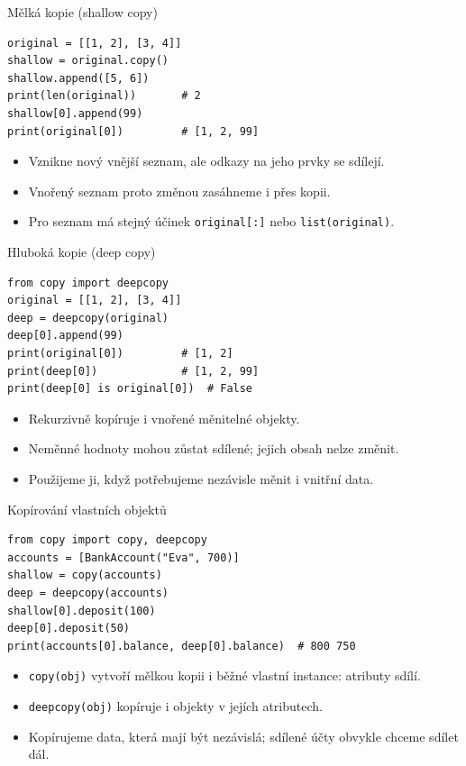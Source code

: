\documentclass[aspectratio=169]{beamer}
\begin{document}
\begin{frame}[fragile]{Mělká kopie (shallow copy)}
\begin{lstlisting}[style=python,basicstyle=\ttfamily\normalsize]
original = [[1, 2], [3, 4]]
shallow = original.copy()
shallow.append([5, 6])
print(len(original))       # 2
shallow[0].append(99)
print(original[0])         # [1, 2, 99]
\end{lstlisting}
  \begin{itemize}
    \item Vznikne nový vnější seznam, ale odkazy na jeho prvky se sdílejí.
    \item Vnořený seznam proto změnou zasáhneme i přes kopii.
    \item Pro seznam má stejný účinek \texttt{original[:]} nebo \texttt{list(original)}.
  \end{itemize}
\end{frame}

\begin{frame}[fragile]{Hluboká kopie (deep copy)}
\begin{lstlisting}[style=python,basicstyle=\ttfamily\normalsize]
from copy import deepcopy
original = [[1, 2], [3, 4]]
deep = deepcopy(original)
deep[0].append(99)
print(original[0])         # [1, 2]
print(deep[0])             # [1, 2, 99]
print(deep[0] is original[0])  # False
\end{lstlisting}
  \begin{itemize}
    \item Rekurzivně kopíruje i vnořené měnitelné objekty.
    \item Neměnné hodnoty mohou zůstat sdílené; jejich obsah nelze změnit.
    \item Použijeme ji, když potřebujeme nezávisle měnit i vnitřní data.
  \end{itemize}
\end{frame}

\begin{frame}[fragile]{Kopírování vlastních objektů}
\begin{lstlisting}[style=python,basicstyle=\ttfamily\normalsize]
from copy import copy, deepcopy
accounts = [BankAccount("Eva", 700)]
shallow = copy(accounts)
deep = deepcopy(accounts)
shallow[0].deposit(100)
deep[0].deposit(50)
print(accounts[0].balance, deep[0].balance)  # 800 750
\end{lstlisting}
  \begin{itemize}
    \item \texttt{copy(obj)} vytvoří mělkou kopii i běžné vlastní instance: atributy sdílí.
    \item \texttt{deepcopy(obj)} kopíruje i objekty v jejích atributech.
    \item Kopírujeme data, která mají být nezávislá; sdílené účty obvykle chceme sdílet dál.
  \end{itemize}
\end{frame}
\end{document}

